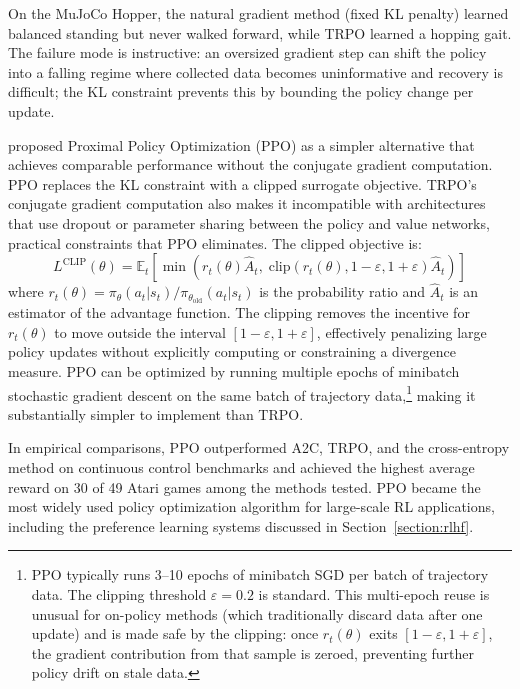 On the MuJoCo Hopper, the natural gradient method (fixed KL penalty) learned balanced standing but never walked forward, while TRPO learned a hopping gait. The failure mode is instructive: an oversized gradient step can shift the policy into a falling regime where collected data becomes uninformative and recovery is difficult; the KL constraint prevents this by bounding the policy change per update.

\citet{Schulman2017} proposed Proximal Policy Optimization (PPO) as a simpler alternative that achieves comparable performance without the conjugate gradient computation. PPO replaces the KL constraint with a clipped surrogate objective. TRPO's conjugate gradient computation also makes it incompatible with architectures that use dropout or parameter sharing between the policy and value networks, practical constraints that PPO eliminates. The clipped objective is:
\begin{equation}
L^{\text{CLIP}}(\theta) = \mathbb{E}_t \left[ \min\!\left( r_t(\theta) \hat{A}_t, \; \text{clip}(r_t(\theta), 1-\varepsilon, 1+\varepsilon) \hat{A}_t \right) \right]
\end{equation}
where $r_t(\theta) = \pi_\theta(a_t|s_t) / \pi_{\theta_{\text{old}}}(a_t|s_t)$ is the probability ratio and $\hat{A}_t$ is an estimator of the advantage function. The clipping removes the incentive for $r_t(\theta)$ to move outside the interval $[1-\varepsilon, 1+\varepsilon]$, effectively penalizing large policy updates without explicitly computing or constraining a divergence measure. PPO can be optimized by running multiple epochs of minibatch stochastic gradient descent on the same batch of trajectory data,\footnote{PPO typically runs 3--10 epochs of minibatch SGD per batch of trajectory data. The clipping threshold $\varepsilon = 0.2$ is standard. This multi-epoch reuse is unusual for on-policy methods (which traditionally discard data after one update) and is made safe by the clipping: once $r_t(\theta)$ exits $[1-\varepsilon, 1+\varepsilon]$, the gradient contribution from that sample is zeroed, preventing further policy drift on stale data.} making it substantially simpler to implement than TRPO.

In empirical comparisons, PPO outperformed A2C, TRPO, and the cross-entropy method on continuous control benchmarks and achieved the highest average reward on 30 of 49 Atari games among the methods tested. PPO became the most widely used policy optimization algorithm for large-scale RL applications, including the preference learning systems discussed in Section~\ref{section:rlhf}.

